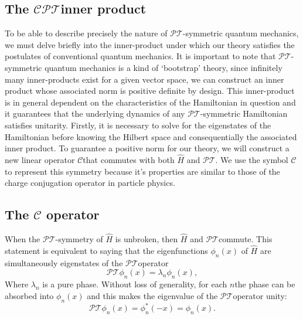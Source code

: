 \documentclass[12pt, a4paper]{report}
\newcommand\PT{\(\mathcal{PT}\)}
\newcommand\CC{\(\mathcal{C}\)}
\begin{document}
\subsection{The \texorpdfstring{$\mathcal{CPT}$}\:\:inner product}\label{CPT}
To be able to describe precisely the nature of \PT-symmetric quantum mechanics, we must delve briefly into the inner-product under which our theory satisfies the postulates of conventional quantum mechanics. It is important to note that \PT-symmetric quantum mechanics is a kind of `bootstrap' theory\cite{MakingSense}, since infinitely many inner-products exist for a given vector space, we can construct an inner product whose associated norm is positive definite by design. This inner-product is in general dependent on the characteristics of the Hamiltonian in question and it guarantees that the underlying dynamics of any \PT-symmetric Hamiltonian satisfies unitarity\cite{MustaHbeHermitian}.
Firstly, it is necessary to solve for the eigenstates of the Hamiltonian before knowing the Hilbert space and consequentially the associated inner product.
To guarantee a positive norm for our theory, we will construct a new linear operator \CC\:that commutes with both $\hat{H}$ and \PT. We use the symbol \CC\: to represent this symmetry because it's properties are similar to those of the charge conjugation operator in particle physics\cite{MakingSense}.

\subsection{The $\mathcal{C}$ operator}\label{CC}
When the \PT-symmetry of $\hat{H}$ is unbroken, then $\hat{H}$ and \PT\:commute. This statement is equivalent to saying that the eigenfunctions $\phi_n(x)$ of $\hat{H}$ are simultaneously eigenstates of the \PT\:operator\cite{Bender_2004}
\begin{equation}\label{eq:1.5}
\mathcal{PT}\phi_n(x) = \lambda_n \phi_n(x),
\end{equation}
Where $\lambda_n$ is a pure phase. Without loss of generality, for each $n$\:the phase can be absorbed into $\phi_n(x)$ and this makes the eigenvalue of the \PT operator unity\cite{Bender_2004}: 
\begin{equation}\label{eq:1.6}
\mathcal{PT}\phi_n(x) = \phi_{n}^{*}(-x) = \phi_n(x).
\end{equation}
\end{document}
